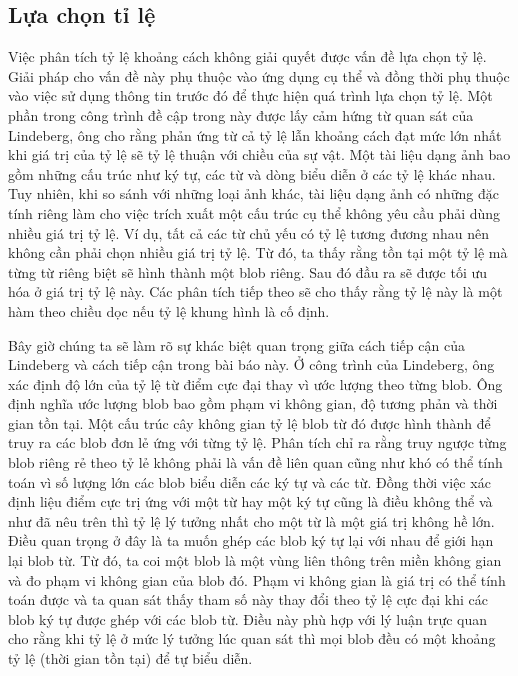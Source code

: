 \documentclass[a4paper]{article}
\begin{document}
\subsection{Lựa chọn tỉ lệ}
Việc phân tích tỷ lệ khoảng cách không giải quyết được vấn đề lựa chọn tỷ lệ. Giải pháp cho vấn đề này phụ thuộc vào ứng dụng cụ thể và đồng thời phụ thuộc vào việc sử dụng thông tin trước đó để thực hiện quá trình lựa chọn tỷ lệ. Một phần trong công trình đề cập trong này được lấy cảm hứng từ quan sát của Lindeberg, ông cho rằng phản ứng từ cả tỷ lệ lẫn khoảng cách đạt mức lớn nhất khi giá trị của tỷ lệ sẽ tỷ lệ thuận với chiều của sự vật. Một tài liệu dạng ảnh bao gồm những cấu trúc như ký tự, các từ và dòng biểu diễn ở các tỷ lệ khác nhau. Tuy nhiên, khi so sánh với những loại ảnh khác, tài liệu dạng ảnh có những đặc tính riêng làm cho việc trích xuất một cấu trúc cụ thể không yêu cầu phải dùng nhiều giá trị tỷ lệ. Ví dụ, tất cả các từ chủ yếu có tỷ lệ tương đương nhau nên không cần phải chọn nhiều giá trị tỷ lệ. Từ đó, ta thấy rằng tồn tại một tỷ lệ mà từng từ riêng biệt sẽ hình thành một blob riêng. Sau đó đầu ra sẽ được tối ưu hóa ở giá trị tỷ lệ này. Các phân tích tiếp theo sẽ cho thấy rằng tỷ lệ này là một hàm theo chiều dọc nếu tỷ lệ khung hình là cố định.\par

Bây giờ chúng ta sẽ làm rõ sự khác biệt quan trọng giữa cách tiếp cận của Lindeberg và cách tiếp cận trong bài báo này. Ở công trình của Lindeberg, ông xác định độ lớn của tỷ lệ từ điểm cực đại thay vì ước lượng theo từng blob. Ông định nghĩa ước lượng blob bao gồm phạm vi không gian, độ tương phản và thời gian tồn tại. Một cấu trúc cây không gian tỷ lệ blob từ đó được hình thành để truy ra các blob đơn lẻ ứng với từng tỷ lệ. Phân tích chỉ ra rằng truy ngược từng blob riêng rẻ theo tỷ lẻ không phải là vấn đề liên quan cũng như khó có thể tính toán vì số lượng lớn các blob biểu diễn các ký tự và các từ. Đồng thời việc xác định liệu điểm cực trị ứng với một từ hay một ký tự cũng là điều không thể và như đã nêu trên thì tỷ lệ lý tưởng nhất cho một từ là một giá trị không hề lớn. Điều quan trọng ở đây là ta muốn ghép các blob ký tự lại với nhau để giới hạn lại blob từ. Từ đó, ta coi một blob là một vùng liên thông trên miền không gian và đo phạm vi không gian của blob đó. Phạm vi không gian là giá trị có thể tính toán được và ta quan sát thấy tham số này thay đổi theo tỷ lệ cực đại khi các blob ký tự được ghép với các blob từ. Điều này phù hợp với lý luận trực quan cho rằng khi tỷ lệ ở mức lý tưởng lúc quan sát thì mọi blob đều có một khoảng tỷ lệ (thời gian tồn tại) để tự biểu diễn.\par
\end{document}
